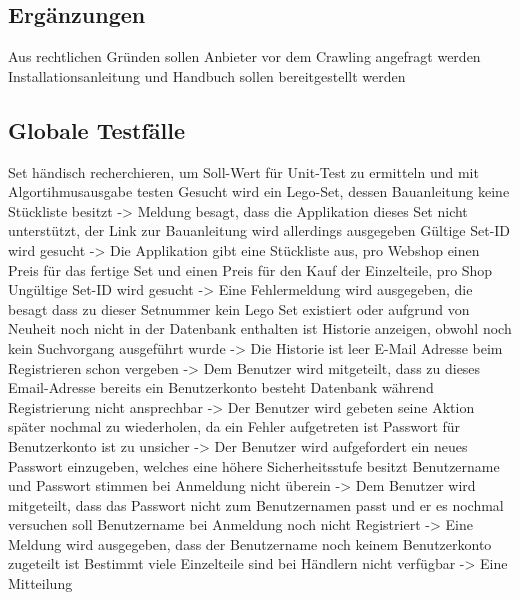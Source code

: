 \subsection{Ergänzungen}
Aus rechtlichen Gründen sollen Anbieter vor dem Crawling angefragt werden \newline
Installationsanleitung und Handbuch sollen bereitgestellt werden \newline

\subsection{Globale Testfälle}
Set händisch recherchieren, um Soll-Wert für Unit-Test zu ermitteln und mit Algortihmusausgabe testen \newline
Gesucht wird ein Lego-Set, dessen Bauanleitung keine Stückliste besitzt -> Meldung besagt, dass die Applikation dieses Set nicht unterstützt, der Link zur Bauanleitung wird allerdings ausgegeben \newline
Gültige Set-ID wird gesucht -> Die Applikation gibt eine Stückliste aus, pro Webshop einen Preis für das fertige Set und einen Preis für den Kauf der Einzelteile, pro Shop \newline
Ungültige Set-ID wird gesucht -> Eine Fehlermeldung wird ausgegeben, die besagt dass zu dieser Setnummer kein Lego Set existiert oder aufgrund von Neuheit noch nicht in der Datenbank enthalten ist \newline
Historie anzeigen, obwohl noch kein Suchvorgang ausgeführt wurde -> Die Historie ist leer \newline
E-Mail Adresse beim Registrieren schon vergeben -> Dem Benutzer wird mitgeteilt, dass zu dieses Email-Adresse bereits ein Benutzerkonto besteht \newline
Datenbank während Registrierung nicht ansprechbar -> Der Benutzer wird gebeten seine Aktion später nochmal zu wiederholen, da ein Fehler aufgetreten ist \newline
Passwort für Benutzerkonto ist zu unsicher -> Der Benutzer wird aufgefordert ein neues Passwort einzugeben, welches eine höhere Sicherheitsstufe besitzt \newline
Benutzername und Passwort stimmen bei Anmeldung nicht überein -> Dem Benutzer wird mitgeteilt, dass das Passwort nicht zum Benutzernamen passt und er es nochmal versuchen soll \newline
Benutzername bei Anmeldung noch nicht Registriert -> Eine Meldung wird ausgegeben, dass der Benutzername noch keinem Benutzerkonto zugeteilt ist \newline
Bestimmt viele Einzelteile sind bei Händlern nicht verfügbar -> Eine Mitteilung 